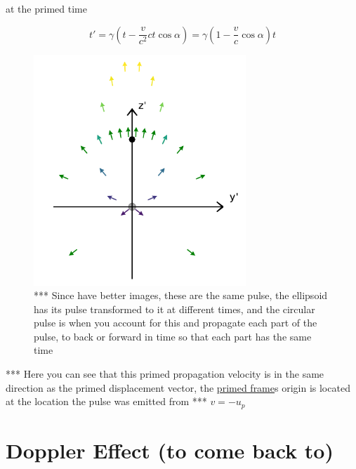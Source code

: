 at the primed time

\begin{equation}
	t' = \gamma \left(t - \dfrac{v}{c^2}ct\cos{\alpha}\right) =  \gamma \left(1 - \frac{v}{c} \cos{\alpha}\right) t
\end{equation}

\begin{figure}[H]
	\centering
	\includegraphics[width=8cm]{images/pdf/Prime_Pulse.pdf}
	\caption{*** Since have better images, these are the same pulse, the ellipsoid has its pulse transformed to it at different times, and the circular pulse is when you account for this and propagate each part of the pulse, to back or forward in time so that each part has the same time}
	\label{fig: Prime Pulse}
\end{figure}

*** Here you can see that this primed propagation velocity is in the same direction as the primed displacement vector, the \hyperlink{def-Primed-Frame}{primed frame}s origin is located at the location the pulse was emitted from \newline
*** $v=-u_p$

\section{Doppler Effect (to come back to)}

